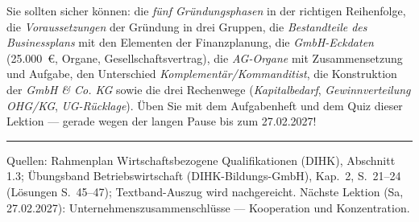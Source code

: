 \documentclass[11pt, a4paper]{article}
\begin{document}
\begin{merksatz}[title={\bfseries Wichtig für die Prüfungsvorbereitung}]
Sie sollten sicher können: die \emph{fünf Gründungsphasen} in der richtigen Reihenfolge,
die \emph{Voraussetzungen} der Gründung in drei Gruppen, die \emph{Bestandteile des
Businessplans} mit den Elementen der Finanzplanung, die \emph{GmbH-Eckdaten} (25.000~€,
Organe, Gesellschaftsvertrag), die \emph{AG-Organe} mit Zusammensetzung und Aufgabe, den
Unterschied \emph{Komplementär/Kommanditist}, die Konstruktion der
\emph{GmbH \& Co. KG} sowie die drei Rechenwege (\emph{Kapitalbedarf},
\emph{Gewinnverteilung OHG/KG}, \emph{UG-Rücklage}). Üben Sie mit dem Aufgabenheft und
dem Quiz dieser Lektion ---
gerade wegen der langen Pause bis zum 27.02.2027!
\end{merksatz}

\vspace{1em}
\hrule
\vspace{0.8em}
\noindent\textsf{\small Quellen: Rahmenplan Wirtschaftsbezogene Qualifikationen (DIHK), Abschnitt 1.3;
Übungsband Betriebswirtschaft (DIHK-Bildungs-GmbH), Kap.~2, S.~21--24 (Lösungen S.~45--47);
Textband-Auszug wird nachgereicht. Nächste Lektion (Sa, 27.02.2027): Unternehmenszusammenschlüsse ---
Kooperation und Konzentration.}
\end{document}
